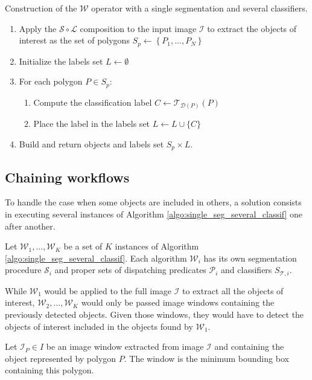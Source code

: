 \begin{algorithm}\label{algo:single_seg_several_classif}
Construction of the $\mathcal{W}$ operator with a single segmentation and several classifiers. 
\begin{enumerate}
	\item Apply the $\mathcal{S} \circ \mathcal{L}$ composition to the input image $\mathcal{I}$ to extract the objects of interest as the set of polygons $S_p \leftarrow \left\{P_1, ..., P_N \right\}$
	\item Initialize the labels set $L \leftarrow \emptyset$
	\item For each polygon $P \in S_p$:
	\begin{enumerate}
		\item Compute the classification label $C \leftarrow \mathcal{T}_{\mathcal{D}(P)}(P)$
		\item Place the label in the labels set $L \leftarrow L \cup \{C\}$
	\end{enumerate}
	\item Build and return objects and labels set $S_p \times L$.
\end{enumerate}
\end{algorithm}

\subsection{Chaining workflows}

To handle the case when some objects are included in others, a solution consists in executing several instances of Algorithm \ref{algo:single_seg_several_classif} one after another. 

\begin{definition}\label{def:several_w_op}
	Let $\mathcal{W}_1, ..., \mathcal{W}_K$ be a set of $K$ instances of Algorithm \ref{algo:single_seg_several_classif}. Each algorithm $\mathcal{W}_i$ has its own segmentation procedure $\mathcal{S}_i$ and proper sets of dispatching predicates $\mathcal{P}_i$ and classifiers $S_{\mathcal{T},i}$.
\end{definition}

While $\mathcal{W}_1$ would be applied to the full image $\mathcal{I}$ to extract all the objects of interest, $\mathcal{W}_2, ..., \mathcal{W}_K$ would only be passed image windows containing the previously detected objects. Given those windows, they would have to detect the objects of interest included in the objects found by $\mathcal{W}_1$. 

\begin{definition}\label{def:image_window}
	Let $\mathcal{I}_P \in I$ be an image window extracted from image $\mathcal{I}$ and containing the object represented by polygon $P$. The window is the minimum bounding box containing this polygon.
\end{definition}

